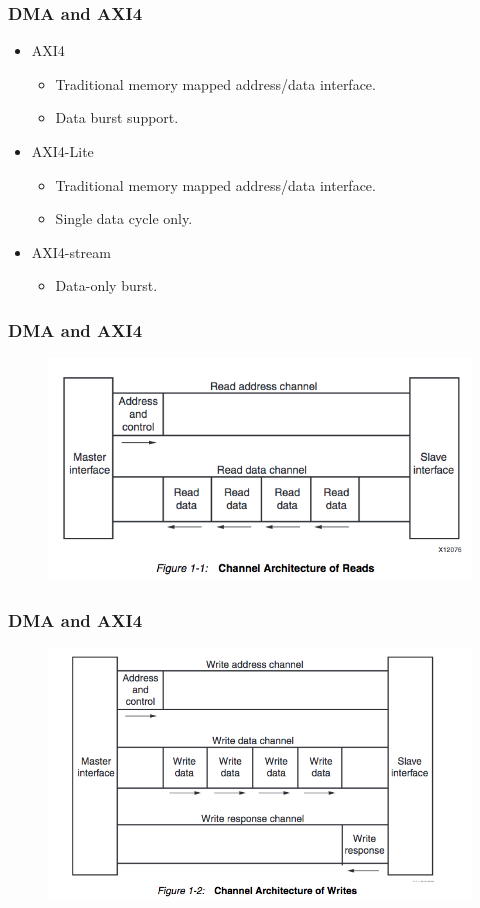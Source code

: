\documentclass{beamer}
\begin{document}
\begin{frame}
\frametitle{DMA and AXI4}
\begin{itemize}
\item AXI4
	\begin{itemize}
	\item Traditional memory mapped address/data interface.
	\item Data burst support.
	\end{itemize}
\item AXI4-Lite
	\begin{itemize}
	\item Traditional memory mapped address/data interface.
	\item Single data cycle only.
	\end{itemize}
\item AXI4-stream
	\begin{itemize}
	\item Data-only burst.
	\end{itemize}
\end{itemize}
\end{frame}

\begin{frame}
\frametitle{DMA and AXI4}
\begin{figure}
\centering\includegraphics[scale=0.35]{axi-read.png}

\end{figure}
\end{frame}

\begin{frame}
\frametitle{DMA and AXI4}
\begin{figure}
\centering\includegraphics[scale=0.35]{axi-write.png}

\end{figure}
\end{frame}
\end{document}

